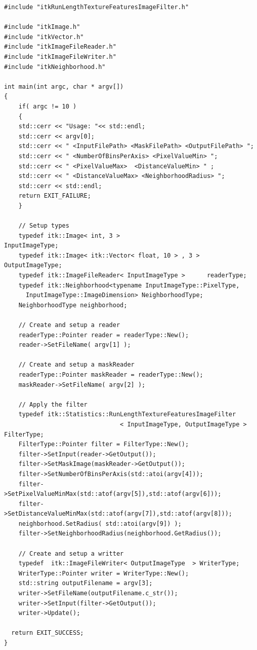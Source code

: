 \documentclass{InsightArticle}
\begin{document}
\begin{verbatim}
#include "itkRunLengthTextureFeaturesImageFilter.h"

#include "itkImage.h"
#include "itkVector.h"
#include "itkImageFileReader.h"
#include "itkImageFileWriter.h"
#include "itkNeighborhood.h"

int main(int argc, char * argv[])
{
    if( argc != 10 )
    {
    std::cerr << "Usage: "<< std::endl;
    std::cerr << argv[0];
    std::cerr << " <InputFilePath> <MaskFilePath> <OutputFilePath> ";
    std::cerr << " <NumberOfBinsPerAxis> <PixelValueMin> ";
    std::cerr << " <PixelValueMax>  <DistanceValueMin> " ;
    std::cerr << " <DistanceValueMax> <NeighborhoodRadius> ";
    std::cerr << std::endl;
    return EXIT_FAILURE;
    }

    // Setup types
    typedef itk::Image< int, 3 >                        InputImageType;
    typedef itk::Image< itk::Vector< float, 10 > , 3 >  OutputImageType;
    typedef itk::ImageFileReader< InputImageType >      readerType;
    typedef itk::Neighborhood<typename InputImageType::PixelType,
      InputImageType::ImageDimension> NeighborhoodType;
    NeighborhoodType neighborhood;

    // Create and setup a reader
    readerType::Pointer reader = readerType::New();
    reader->SetFileName( argv[1] );

    // Create and setup a maskReader
    readerType::Pointer maskReader = readerType::New();
    maskReader->SetFileName( argv[2] );

    // Apply the filter
    typedef itk::Statistics::RunLengthTextureFeaturesImageFilter
                                < InputImageType, OutputImageType > FilterType;
    FilterType::Pointer filter = FilterType::New();
    filter->SetInput(reader->GetOutput());
    filter->SetMaskImage(maskReader->GetOutput());
    filter->SetNumberOfBinsPerAxis(std::atoi(argv[4]));
    filter->SetPixelValueMinMax(std::atof(argv[5]),std::atof(argv[6]));
    filter->SetDistanceValueMinMax(std::atof(argv[7]),std::atof(argv[8]));
    neighborhood.SetRadius( std::atoi(argv[9]) );
    filter->SetNeighborhoodRadius(neighborhood.GetRadius());

    // Create and setup a writter
    typedef  itk::ImageFileWriter< OutputImageType  > WriterType;
    WriterType::Pointer writer = WriterType::New();
    std::string outputFilename = argv[3];
    writer->SetFileName(outputFilename.c_str());
    writer->SetInput(filter->GetOutput());
    writer->Update();

  return EXIT_SUCCESS;
}
\end{verbatim}
\normalsize
\end{document}
